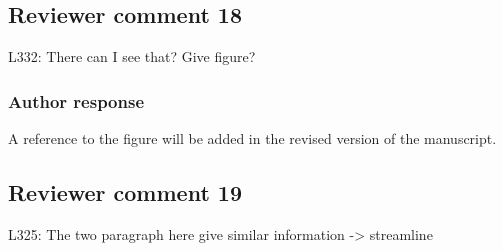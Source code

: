 \documentclass[11pt]{scrartcl}
\begin{document}
%
%
%


\subsection*{Reviewer comment 18}
L332: There can I see that? Give figure?

\subsubsection*{Author response}

A reference to the figure will be added in the revised version of the
manuscript.

\subsection*{Reviewer comment 19}
L325: The two paragraph here give similar information -> streamline
\end{document}
